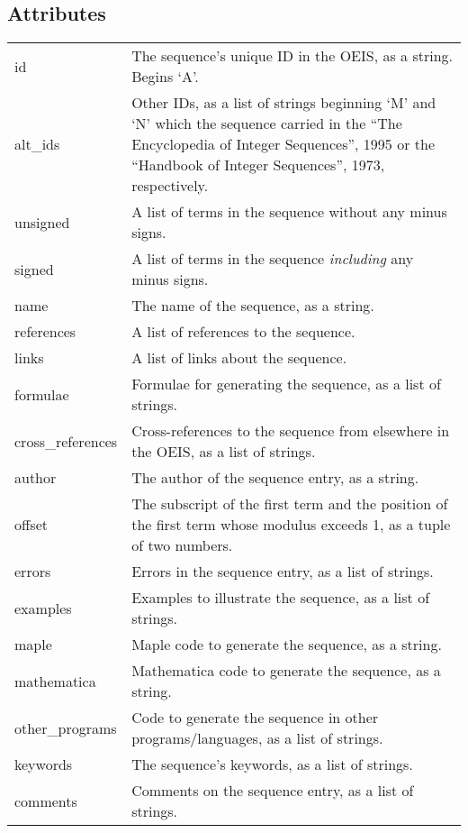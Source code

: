 \documentclass[letterpaper,10pt,english]{sphinxmanual}
\begin{document}
\subsection{Attributes}
\label{api:attributes}
\begin{tabulary}{\linewidth}{|L|L|}
\hline

id
 & 
The sequence's unique ID in the OEIS, as a string. Begins `A'.
\\

alt\_ids
 & 
Other IDs, as a list of strings beginning `M' and `N' which
the sequence carried in the ``The Encyclopedia of Integer
Sequences'', 1995 or the ``Handbook of Integer Sequences'', 1973,
respectively.
\\

unsigned
 & 
A list of terms in the sequence without any minus signs.
\\

signed
 & 
A list of terms in the sequence \emph{including} any minus signs.
\\

name
 & 
The name of the sequence, as a string.
\\

references
 & 
A list of references to the sequence.
\\

links
 & 
A list of links about the sequence.
\\

formulae
 & 
Formulae for generating the sequence, as a list of strings.
\\

cross\_references
 & 
Cross-references to the sequence from elsewhere in the OEIS,
as a list of strings.
\\

author
 & 
The author of the sequence entry, as a string.
\\

offset
 & 
The subscript of the first term and the position of the first
term whose modulus exceeds 1, as a tuple of two numbers.
\\

errors
 & 
Errors in the sequence entry, as a list of strings.
\\

examples
 & 
Examples to illustrate the sequence, as a list of strings.
\\

maple
 & 
Maple code to generate the sequence, as a string.
\\

mathematica
 & 
Mathematica code to generate the sequence, as a string.
\\

other\_programs
 & 
Code to generate the sequence in other programs/languages, as
a list of strings.
\\

keywords
 & 
The sequence's keywords, as a list of strings.
\\

comments
 & 
Comments on the sequence entry, as a list of strings.
\\
\hline\end{tabulary}
\end{document}
